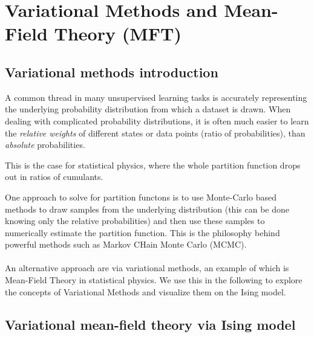 \section{Variational Methods and Mean-Field Theory (MFT)}
\label{sec:varMFT}
\subsection{Variational methods introduction}
\label{subsec:varMFTconcept}
A common thread in many unsupervised learning tasks is accurately representing the underlying probability distribution from which a dataset is drawn. When dealing with complicated probability distributions, it is often much easier to learn the \emph{relative weights} of different states or data points (ratio of probabilities), than \emph{absolute} probabilities. 
\begin{example}
	This is the case for statistical physics, where the whole partition function drops out in ratios of cumulants. 
\end{example}
One approach to solve for partition functons is to use Monte-Carlo based methods to draw samples from the underlying distribution (this can be done knowing only the relative probabilities) and then use these samples to numerically estimate the partition function. This is the philosophy behind powerful methods such as Markov CHain Monte Carlo (MCMC).\\
\\
An alternative approach are via variational methods, an example of which is Mean-Field Theory in statistical physics. We use this in the following to explore the concepts of Variational Methods and visualize them on the Ising model.



\subsection{Variational mean-field theory via Ising model}

